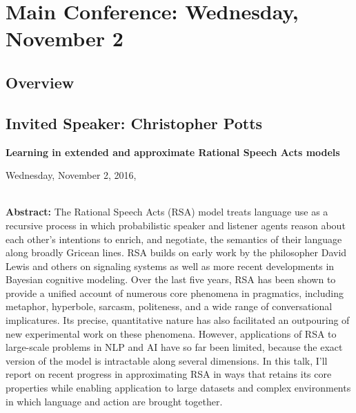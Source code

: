 
\chapter{Main Conference: Wednesday, November 2}

\thispagestyle{emptyheader}
\section*{Overview}


\clearpage{}

\section{Invited Speaker: Christopher Potts}

\begin{center}
\textbf{\Large{}Learning in extended and approximate Rational Speech Acts models}{\Large{}\vspace{1em}
}
\par\end{center}{\Large \par}

\begin{center}
Wednesday, November 2, 2016,  \vspace{1em}
\\
 \PlenaryLoc \\
 \vspace{1em}

\par\end{center}

\noindent \textbf{Abstract:} The Rational Speech Acts (RSA) model treats language use as a recursive process in which probabilistic speaker and listener agents reason about each other's intentions to enrich, and negotiate, the semantics of their language along broadly Gricean lines. RSA builds on early work by the philosopher David Lewis and others on signaling systems as well as more recent developments in Bayesian cognitive modeling. Over the last five years, RSA has been shown to provide a unified account of numerous core phenomena in pragmatics, including metaphor, hyperbole, sarcasm, politeness, and a wide range of conversational implicatures. Its precise, quantitative nature has also facilitated an outpouring of new experimental work on these phenomena. However, applications of RSA to large-scale problems in NLP and AI have so far been limited, because the exact version of the model is intractable along several dimensions. In this talk, I'll report on recent progress in approximating RSA in ways that retains its core properties while enabling application to large datasets and complex environments in which language and action are brought together. 


